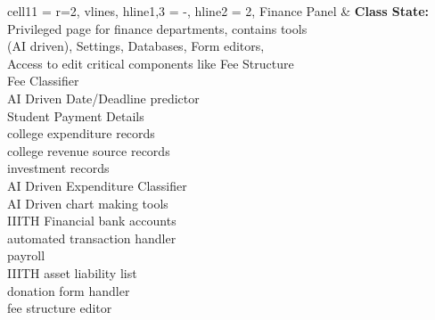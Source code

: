 \documentclass[11pt]{article}
\begin{document}
\begin{longtblr}[
  label = none,
  entry = none,
]{
  cell{1}{1} = {r=2}{},
  vlines,
  hline{1,3} = {-}{},
  hline{2} = {2}{},
}
Finance Panel & {\textbf{Class State:} Privileged page for finance departments, contains tools \\
(AI driven), Settings, Databases, Form editors, \\Access to edit critical components like Fee Structure\\
\hspace{\dimexpr\labelsep+0.5\tabcolsep}Fee Classifier\\
\hspace{\dimexpr\labelsep+0.5\tabcolsep}AI Driven Date/Deadline
predictor\\
\hspace{\dimexpr\labelsep+0.5\tabcolsep}Student Payment Details\\
\hspace{\dimexpr\labelsep+0.5\tabcolsep}college expenditure records\\
\hspace{\dimexpr\labelsep+0.5\tabcolsep}college revenue source records\\
\hspace{\dimexpr\labelsep+0.5\tabcolsep}investment records\\
\hspace{\dimexpr\labelsep+0.5\tabcolsep}AI Driven Expenditure Classifier\\
\hspace{\dimexpr\labelsep+0.5\tabcolsep}AI Driven chart making tools\\
\hspace{\dimexpr\labelsep+0.5\tabcolsep}IIITH Financial bank accounts\\
\hspace{\dimexpr\labelsep+0.5\tabcolsep}automated transaction handler\\
\hspace{\dimexpr\labelsep+0.5\tabcolsep}payroll\\
\hspace{\dimexpr\labelsep+0.5\tabcolsep}IIITH asset liability list\\
\hspace{\dimexpr\labelsep+0.5\tabcolsep}donation form handler\\
\hspace{\dimexpr\labelsep+0.5\tabcolsep}fee structure editor\\
}
\end{longtblr}
\end{document}
